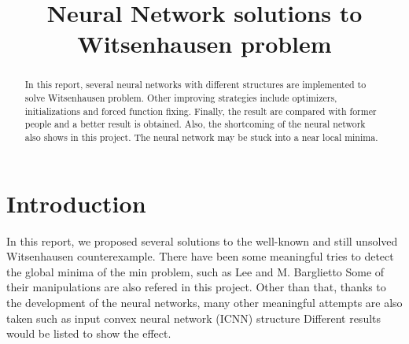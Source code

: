\documentclass[conference,compsoc]{IEEEtran}
\begin{document}
%
\title{Neural Network solutions to Witsenhausen problem}


\author{
}


\maketitle

\begin{abstract}
 In this report, several neural networks with different structures are implemented to solve Witsenhausen problem. Other improving strategies include optimizers, initializations and forced function fixing. Finally, the result are compared with former people and a better result is obtained. Also, the shortcoming of the neural network also shows in this project. The neural network may be stuck into a near local minima.
\end{abstract}


\section{Introduction}
  In this report, we proposed several solutions to the well-known and still unsolved Witsenhausen counterexample. \cite{witsenhausen1968counterexample} There have been some meaningful tries to detect the global minima of the min problem, such as Lee \cite{lee2001witsenhausen}and M. Barglietto \cite{baglietto2001numerical} Some of their manipulations are also refered in this project. Other than that, thanks to the development of the neural networks, many other meaningful attempts are also taken such as input convex neural network (ICNN) structure \cite{amos2017input} Different results would be listed to show the effect.

\end{document}
